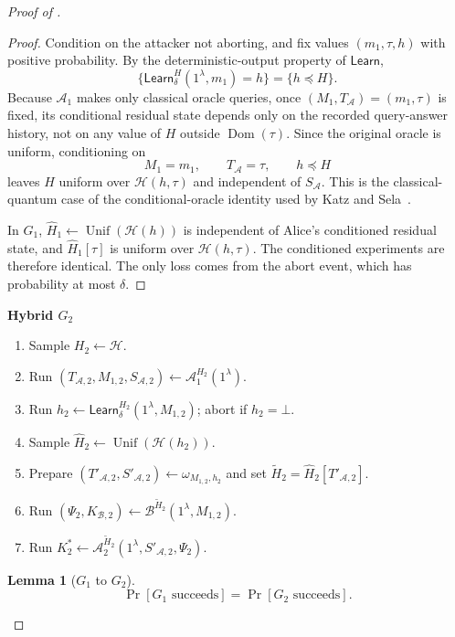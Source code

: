 \documentclass[11pt]{article}
\newtheorem{lemma}[lemma]{Lemma}
\newcommand{\cA}{\mathcal{A}}
\newcommand{\cB}{\mathcal{B}}
\newcommand{\cH}{\mathcal{H}}
\newcommand{\Dom}{\operatorname{Dom}}
\newcommand{\Unif}{\operatorname{Unif}}
\newcommand{\Learn}{\mathsf{Learn}}
\newcommand{\changed}[1]{\textcolor{purple!75!black}{#1}}
\newenvironment{hybrid}[1]{%
  \par\medskip
  \noindent\textbf{#1}
  \begin{enumerate}[leftmargin=2.5em,label=\arabic*.,itemsep=0.25em,topsep=0.35em]
}{%
  \end{enumerate}
  \medskip
}
\begin{document}
\begin{proof}[Proof of ]
\begin{proof}
Condition on the attacker not aborting, and fix values
\((m_1,\tau,h)\) with positive probability. By the deterministic-output
property of \(\Learn\),
\[
  \{\Learn_\delta^H(1^\lambda,m_1)=h\}
  =
  \{h\preceq H\}.
\]
Because \(\cA_1\) makes only classical oracle queries, once
\((M_1,T_{\cA})=(m_1,\tau)\) is fixed, its conditional residual state
depends only on the recorded query-answer history, not on any value of
\(H\) outside \(\Dom(\tau)\). Since the original oracle is uniform,
conditioning on
\[
  M_1=m_1,\qquad T_{\cA}=\tau,\qquad h\preceq H
\]
leaves \(H\) uniform over \(\cH(h,\tau)\) and independent of
\(S_{\cA}\). This is the classical-quantum case of the
conditional-oracle identity used by Katz and
Sela~\cite[Lemma~6]{KatzSela24}.

In \(G_1\),
\(\widehat H_1\leftarrow\Unif(\cH(h))\) is independent of Alice's conditioned
residual state, and \(\widehat H_1[\tau]\) is uniform over \(\cH(h,\tau)\). The
conditioned experiments are therefore identical. The only loss comes from
the abort event, which has probability at most \(\delta\).
\end{proof}

\begin{hybrid}{Hybrid \(G_2\)}
  \item Sample \(H_2\leftarrow\cH\).
  \item Run
  \((T_{\cA,2},M_{1,2},S_{\cA,2})
  \leftarrow\cA_1^{H_2}(1^\lambda)\).
  \item Run
  \(h_2\leftarrow\Learn_\delta^{H_2}(1^\lambda,M_{1,2})\); abort if
  \(h_2=\bot\).
  \item Sample \(\widehat H_2\leftarrow\Unif(\cH(h_2))\).
  \item \changed{Prepare
  \((T'_{\cA,2},S'_{\cA,2})\leftarrow\omega_{M_{1,2},h_2}\) and set
  \(\widetilde H_2=\widehat H_2[T'_{\cA,2}]\).}
  \item Run
  \((\Psi_2,K_{\cB,2})
  \leftarrow\cB^{\widetilde H_2}(1^\lambda,M_{1,2})\).
  \item Run
  \(K^*_2
  \leftarrow\cA_2^{\widetilde H_2}
  (1^\lambda,S'_{\cA,2},\Psi_2)\).
\end{hybrid}

\begin{lemma}[\(G_1\) to \(G_2\)]\label{lem:g1-g2}
\[
  \Pr[G_1\text{ succeeds}]
  =
  \Pr[G_2\text{ succeeds}].
\]
\end{lemma}


\end{proof}
\end{document}
